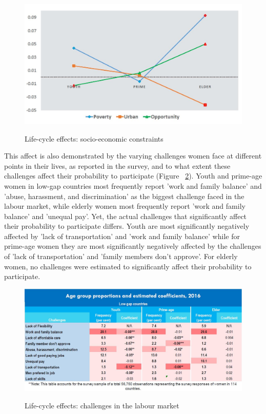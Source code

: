 \begin{figure}[htb]
	\centering
	\caption{Life-cycle effects: socio-economic constraints}
	\includegraphics[width=120mm,keepaspectratio,height=0.6\textheight]{Figures/socioecon}
	\label{fig:constraints}
\end{figure}

This affect is also demonstrated by the varying challenges women face at different points in their lives, as reported in the survey, and to what extent these challenges affect their probability to participate (Figure ~\ref{fig:challenges}). Youth and prime-age women in low-gap countries most frequently report 'work and family balance' and 'abuse, harassment, and discrimination' as the biggest challenge faced in the labour market, while elderly women most frequently report 'work and family balance' and 'unequal pay'. Yet, the actual challenges that significantly affect their probability to participate differs. Youth are most significantly negatively affected by 'lack of transportation' and 'work and family balance' while for prime-age women they are most significantly negatively affected by the challenges of 'lack of transportation' and 'family members don't approve'. For elderly women, no challenges were estimated to significantly affect their probability to participate.  


\begin{figure}[htb]
	\centering
	\caption{Life-cycle effects: challenges in the labour market}
	\includegraphics[width=140mm,keepaspectratio,height=0.6\textheight]{Figures/challenges}
	\label{fig:challenges}
\end{figure}

